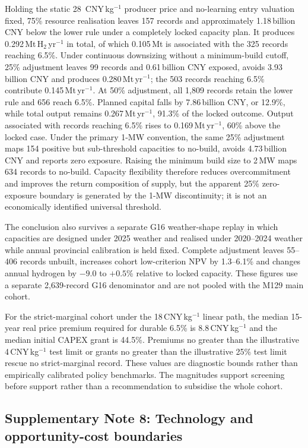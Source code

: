 \documentclass[pdflatex,sn-nature]{sn-jnl}
\newcommand{\cnykg}{CNY\,kg$^{-1}$}
\begin{document}
Holding the static 28~\cnykg{} producer price and no-learning entry valuation fixed, 75\% resource realisation leaves 157 records and approximately 1.18\,billion CNY below the lower rule under a completely locked capacity plan. It produces 0.292\,Mt\,H$_2$\,yr$^{-1}$ in total, of which 0.105\,Mt is associated with the 325 records reaching 6.5\%. Under continuous downsizing without a minimum-build cutoff, 25\% adjustment leaves 99 records and 0.61\,billion CNY exposed, avoids 3.93\,billion CNY and produces 0.280\,Mt\,yr$^{-1}$; the 503 records reaching 6.5\% contribute 0.145\,Mt\,yr$^{-1}$. At 50\% adjustment, all 1,809 records retain the lower rule and 656 reach 6.5\%. Planned capital falls by 7.86\,billion CNY, or 12.9\%, while total output remains 0.267\,Mt\,yr$^{-1}$, 91.3\% of the locked outcome. Output associated with records reaching 6.5\% rises to 0.169\,Mt\,yr$^{-1}$, 60\% above the locked case. Under the primary 1-MW convention, the same 25\% adjustment maps 154 positive but sub-threshold capacities to no-build, avoids 4.73\,billion CNY and reports zero exposure. Raising the minimum build size to 2\,MW maps 634 records to no-build. Capacity flexibility therefore reduces overcommitment and improves the return composition of supply, but the apparent 25\% zero-exposure boundary is generated by the 1-MW discontinuity; it is not an economically identified universal threshold.

The conclusion also survives a separate G16 weather-shape replay in which capacities are designed under 2025 weather and realised under 2020--2024 weather while annual provincial calibration is held fixed. Complete adjustment leaves 55--406 records unbuilt, increases cohort low-criterion NPV by 1.3--6.1\% and changes annual hydrogen by $-9.0$ to $+0.5$\% relative to locked capacity. These figures use a separate 2,639-record G16 denominator and are not pooled with the M129 main cohort.

For the strict-marginal cohort under the 18\,CNY\,kg$^{-1}$ linear path, the median 15-year real price premium required for durable 6.5\% is 8.8\,CNY\,kg$^{-1}$ and the median initial CAPEX grant is 44.5\%. Premiums no greater than the illustrative 4\,CNY\,kg$^{-1}$ test limit or grants no greater than the illustrative 25\% test limit rescue no strict-marginal record. These values are diagnostic bounds rather than empirically calibrated policy benchmarks. The magnitudes support screening before support rather than a recommendation to subsidise the whole cohort.

\subsection*{Supplementary Note 8: Technology and opportunity-cost boundaries}
\end{document}
